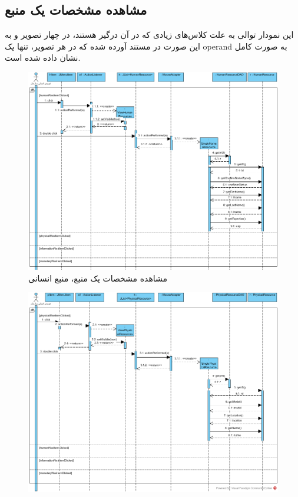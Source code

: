 \begin{landscape}
\begin{landscape}
\section{مشاهده مشخصات یک منبع}
این نمودار توالی به علت کلاس‌های زیادی که در آن درگیر هستند، در چهار تصویر و به این صورت در مستند آورده شده که در هر تصویر، تنها یک operand به صورت کامل نشان داده شده است.
\begin{figure}[H]
	\centering
	\includegraphics[scale=0.6]{img/sequence-design/ViewResourceAttributes_HUMAN}
	\caption{مشاهده مشخصات یک منبع، منبع انسانی}
\end{figure}
\begin{figure}[H]
	\centering
	\includegraphics[scale=0.8]{img/sequence-design/ViewResourceAttributes_PHYSICAL}

\end{figure}
\end{landscape}
\end{landscape}

